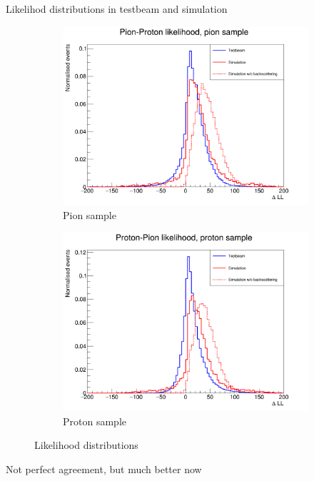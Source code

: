 \documentclass{beamer}
\begin{document}
\begin{frame}{Likelihod distributions in testbeam and simulation}
  \begin{figure}
    \centering
    \vspace{-0.2cm}
    \begin{subfigure}{0.5\textwidth}
      \includegraphics[width = 1.0\textwidth]{Plots/Pion_likelihood_comparison.png}
      \caption{Pion sample}
    \end{subfigure}%
    \begin{subfigure}{0.5\textwidth}
      \includegraphics[width = 1.0\textwidth]{Plots/Proton_likelihood_comparison.png}
      \caption{Proton sample}
    \end{subfigure}
    \caption{Likelihood distributions}
  \end{figure}
  \begin{center}
    \large Not perfect agreement, but much better now
  \end{center}
\end{frame}
\end{document}
